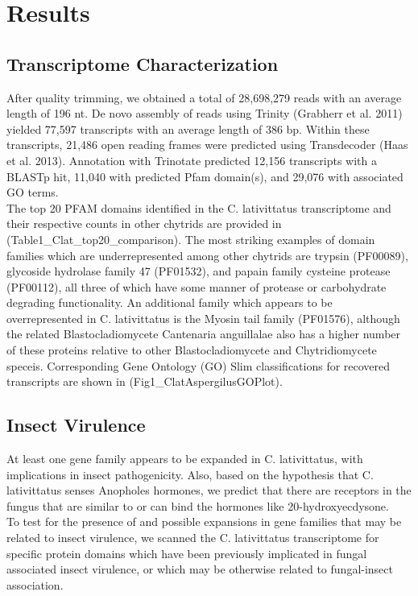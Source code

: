 \section{Results}
\subsection{Transcriptome Characterization}
After quality trimming, we obtained a total of 28,698,279 reads with an average length of 196 nt. De novo assembly of reads using Trinity (Grabherr et al. 2011) yielded 77,597 transcripts with an average length of 386 bp. Within these transcripts, 21,486 open reading frames were predicted using Transdecoder (Haas et al. 2013). Annotation with Trinotate predicted 12,156 transcripts with a BLASTp hit, 11,040 with predicted Pfam domain(s), and 29,076 with associated GO terms. \\
\indent The top 20 PFAM domains identified in the C. lativittatus transcriptome and their respective counts in other chytrids are provided in (Table1\_Clat\_top20\_comparison). The most striking examples of domain families which are underrepresented among other chytrids are trypsin (PF00089), glycoside hydrolase family 47 (PF01532), and papain family cysteine protease (PF00112), all three of which have some manner of protease or carbohydrate degrading functionality. An additional family which appears to be overrepresented in C. lativittatus is the Myosin tail family (PF01576), although the related Blastocladiomycete Cantenaria anguillalae also has a higher number of these proteins relative to other Blastocladiomycete and Chytridiomycete speceis. Corresponding Gene Ontology (GO) Slim classifications for recovered transcripts are shown in (Fig1\_ClatAspergilusGOPlot). \\
\subsection{Insect Virulence} 
At least one gene family appears to be expanded in C. lativittatus, with implications in insect pathogenicity. Also, based on the hypothesis that C. lativittatus senses Anopholes hormones, we predict that there are receptors in the fungus that are similar to or can bind the hormones like 20-hydroxyecdysone. \\
\indent To test for the presence of and possible expansions in gene families that may be related to insect virulence, we scanned the C. lativittatus transcriptome for specific protein domains which have been previously implicated in fungal associated insect virulence, or which may be otherwise related to fungal-insect association. \\
